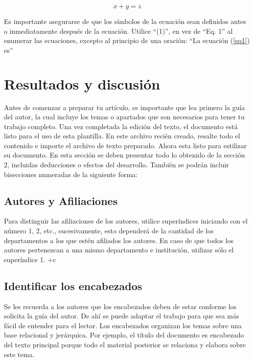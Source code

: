    \begin{equation}
        \label{eq1}
        x + y = z 
    \end{equation}
    
    Es importante asegurarse de que los símbolos de la ecuación sean definidos antes o inmediatamente después de la ecuación. Utilice “(1)”, en vez de “Eq. 1” al enumerar las ecuaciones, excepto al principio de una oración: “La ecuación (\ref{eq1}) es”
    
    
    
    \section{Resultados y discusión}
    
    Antes de comenzar a preparar tu artículo, es importante que lea primero la guía del autor, la cual incluye los temas o apartados que son necesarios para tener tu trabajo completo.
    Una vez completada la edición del texto, el documento está listo para el uso de esta plantilla. En este archivo recién creado, resalte todo el contenido e importe el archivo de texto preparado. Ahora esta listo para estilizar su documento.
    En esta sección se deben presentar todo lo obtenido de la sección 2, incluidas deducciones o efectos del desarrollo. También se podrán incluir bisecciones numeradas de la siguiente forma:
    
    \subsection{Autores y Afiliaciones}
    
    Para distinguir las afiliaciones de los autores, utilice superíndices iniciando con el número 1, 2, etc., sucesivamente, esto dependerá de la cantidad de los departamentos a los que estén afiliados los autores. En caso de que todos los autores pertenezcan a una mismo departamento e institución, utilizar sólo el superíndice 1. 
    +c
    \subsection{Identificar los encabezados}
    
    Se les recuerda a los autores que los encabezados deben de estar conforme los solicita la guía del autor. De ahí se puede adaptar el trabajo para que sea más fácil de entender para el lector.
    Los encabezados organizan los temas sobre una base relacional y jerárquica. Por ejemplo, el título del documento es encabezado del texto principal porque todo el material posterior se relaciona y elabora sobre este tema. 
    
